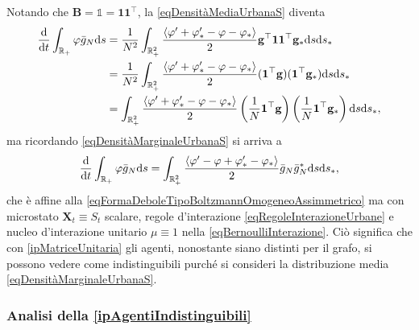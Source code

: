         Notando che \(\mathbf B=\mathbb1=\mathbf1\mathbf1^\top\), la \ref{eqDensitàMediaUrbanaS} diventa
        \begin{equation*}
          \begin{aligned}
            \frac{\mathrm{d}}{\mathrm{d}t}\int_{\mathbb R_+}\varphi\bar g_N\mathrm{d} s
            &=\frac1{N^2}\int_{\mathbb R_+^2}
            \frac{\langle\varphi'+\varphi'_*-\varphi-\varphi_*\rangle}2
            \mathbf g^\top\mathbf1\mathbf1^\top\mathbf g_*\mathrm{d} s\mathrm{d} s_*\\
            &=\frac1{N^2}\int_{\mathbb R_+^2}
            \frac{\langle\varphi'+\varphi'_*-\varphi-\varphi_*\rangle}2
            (\mathbf1^\top\mathbf g)(\mathbf1^\top\mathbf g_*)\mathrm{d} s\mathrm{d} s_*\\
            &=\int_{\mathbb R_+^2}
            \frac{\langle\varphi'+\varphi'_*-\varphi-\varphi_*\rangle}2
            \left(\frac1N\mathbf1^\top\mathbf g\right)
            \left(\frac1N\mathbf1^\top\mathbf g_*\right)\mathrm{d} s\mathrm{d} s_*,
          \end{aligned}
        \end{equation*}
        ma ricordando \cref{eqDensitàMarginaleUrbanaS} si arriva a
        \begin{equation}
          \label{eqTipoBoltzmannConGrafoUnitario}
          \frac{\mathrm{d}}{\mathrm{d}t}\int_{\mathbb R_+}\varphi\bar g_N\mathrm{d} s=
          \int_{\mathbb R_+^2}
          \frac{\langle\varphi'-\varphi+\varphi'_*-\varphi_*\rangle}2
          \bar g_N\bar g^*_N\mathrm{d} s\mathrm{d} s_*,
        \end{equation}
        che è affine alla \ref{eqFormaDeboleTipoBoltzmannOmogeneoAssimmetrico} ma con microstato \(\mathbf X_t\equiv S_t\) scalare, regole d'interazione \ref{eqRegoleInterazioneUrbane} e nucleo d'interazione unitario\footnotemark{} \(\mu\equiv1\) nella \ref{eqBernoulliInterazione}. Ciò significa che con \ref{ipMatriceUnitaria} gli agenti, nonostante siano distinti per il grafo, si possono vedere come indistinguibili purché si consideri la distribuzione media \eqref{eqDensitàMarginaleUrbanaS}.%

      \subsubsection{Analisi della \texorpdfstring{\ref{ipAgentiIndistinguibili}}{S2}}


